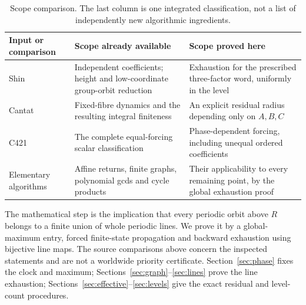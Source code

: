 \begin{table}[t]
\centering
\small
\begin{tabularx}{\textwidth}{@{}>{\raggedright\arraybackslash}p{}YY@{}}
\toprule
Input or comparison & Scope already available & Scope proved here \\
\midrule
Shin \citep{shin2026character}
& Independent coefficients; height and low-coordinate group-orbit reduction
& Exhaustion for the prescribed three-factor word, uniformly in the level \\
Cantat \citep{cantat2009bers}
& Fixed-fibre dynamics and the resulting integral finiteness
& An explicit residual radius depending only on \(A,B,C\) \\
C421 \citep{c4212026integral}
& The complete equal-forcing scalar classification
& Phase-dependent forcing, including unequal ordered coefficients \\
Elementary algorithms
& Affine returns, finite graphs, polynomial gcds and cycle products
& Their applicability to every remaining point, by the global exhaustion proof \\
\bottomrule
\end{tabularx}
\caption{Scope comparison. The last column is one integrated classification,
not a list of independently new algorithmic ingredients.}
\label{tab:ownership}
\end{table}

The mathematical step is the implication that every periodic orbit
above \(R\) belongs to a finite union of whole periodic lines. We prove
it by a global-maximum entry, forced finite-state propagation and
backward exhaustion using bijective line maps. The source comparisons
above concern the inspected statements and are not a worldwide priority
certificate. Section~\ref{sec:phase} fixes the clock and maximum;
Sections~\ref{sec:graph}--\ref{sec:lines} prove the line exhaustion;
Sections~\ref{sec:effective}--\ref{sec:levels} give the exact residual
and level-count procedures.
